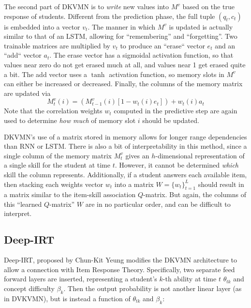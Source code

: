 The second part of DKVMN is to \textit{write} new values into $M^v$ based on the true response of students. Different from the prediction phase, the full tuple $(q_t,c_t)$ is embedded into a vector $v_t$. The manner in which $M^v$ is updated is actually similar to that of an LSTM, allowing for ``remembering'' and ``forgetting''. Two trainable matrices are multiplied by $v_t$ to produce an ``erase`` vector $e_t$ and an ``add`` vector $a_t$. The erase vector has a sigmoidal activation function, so that values near zero do not get erased much at all, and values near 1 get erased quite a bit. The add vector uses a $\tanh$ activation function, so memory slots in $M^v$ can either be increased or decreased. Finally, the columns of the memory matrix are updated via
\begin{equation}
  M_{t}^v(i) = (M_{t-1}^v(i) [1 - w_t(i) e_t] ) + w_t(i) a_t
  \label{eq:update_dkvmn}
\end{equation}
Note that the correlation weights $w_t$ computed in the predictive step are again used to determine \textit{how much} of memory slot $i$ should be updated.


DKVMN's use of a matrix stored in memory allows for longer range dependencies than RNN or LSTM. There is also a bit of interpretability in this method, since a single column of the memory matrix $M_t^v$ gives an $h$-dimensional representation of a single skill for the student at time $t$. However, it cannot be determined \textit{which} skill the column represents. Additionally, if a student answers each available item, then stacking each weights vector $w_t$ into a matrix $W = \{w_t\}_{t=1}^L$ should result in a matrix similar to the item-skill association $Q$-matrix. But again, the columns of this ``learned $Q$-matrix'' $W$ are in no particular order, and can be difficult to interpret.

\subsection{Deep-IRT}
Deep-IRT, proposed by Chun-Kit Yeung \cite{yeung_2019} modifies the DKVMN architecture to allow a connection with Item Response Theory. Specifically, two separate feed forward layers are inserted, representing a student's $k$-th ability at time $t$ $\theta_{tk}$ and concept difficulty $\beta_k$. Then the output probability is not another linear layer (as in DVKVMN), but is instead a function of $\theta_{tk}$ and $\beta_k$:

